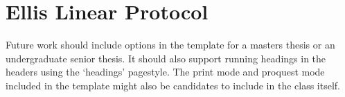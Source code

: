 \section{Ellis Linear Protocol}

Future work should include options in the template for a masters thesis or an undergraduate senior thesis. It should also support running headings in the headers using the `headings' pagestyle.  The print mode and proquest mode included in the template might also be candidates to include in the class itself. 

 